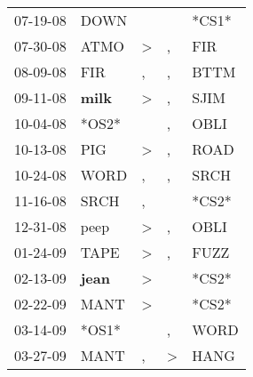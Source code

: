 \begin{supertabular}{p{0.07\textwidth}p{0.06\textwidth}p{0.02\textwidth}p{0.02\textwidth}p{0.06\textwidth}}
          07-19-08\textsuperscript{} &           DOWN\textsuperscript{} &                  &                  &                            *CS1* \\
          07-30-08\textsuperscript{} &           ATMO\textsuperscript{} &     \textgreater &                , &            FIR\textsuperscript{} \\
          08-09-08\textsuperscript{} &            FIR\textsuperscript{} &                , &                , &           BTTM\textsuperscript{} \\
          09-11-08\textsuperscript{} &  \textbf{milk\textsuperscript{}} &     \textgreater &                , &           SJIM\textsuperscript{} \\
          10-04-08\textsuperscript{} &                            *OS2* &                  &                , &           OBLI\textsuperscript{} \\
          10-13-08\textsuperscript{} &            PIG\textsuperscript{} &     \textgreater &                , &           ROAD\textsuperscript{} \\
          10-24-08\textsuperscript{} &           WORD\textsuperscript{} &                , &                , &           SRCH\textsuperscript{} \\
          11-16-08\textsuperscript{} &           SRCH\textsuperscript{} &                , &                  &                            *CS2* \\
          12-31-08\textsuperscript{} &           peep\textsuperscript{} &     \textgreater &                , &           OBLI\textsuperscript{} \\
          01-24-09\textsuperscript{} &           TAPE\textsuperscript{} &     \textgreater &                , &           FUZZ\textsuperscript{} \\
          02-13-09\textsuperscript{} &  \textbf{jean\textsuperscript{}} &     \textgreater &                  &                            *CS2* \\
          02-22-09\textsuperscript{} &           MANT\textsuperscript{} &     \textgreater &                  &                            *CS2* \\
          03-14-09\textsuperscript{} &                            *OS1* &                  &                , &           WORD\textsuperscript{} \\
          03-27-09\textsuperscript{} &           MANT\textsuperscript{} &                , &     \textgreater &           HANG\textsuperscript{} \\

\end{supertabular}
